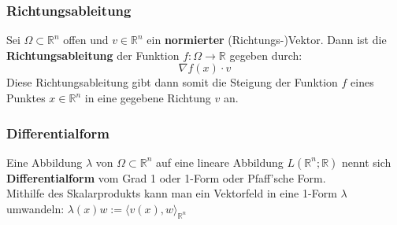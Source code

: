 \documentclass[a4paper,10pt]{scrartcl}
\begin{document}
\subsubsection{Richtungsableitung}
Sei $\Omega\subset \mathbb{R}^n$ offen und $v\in\mathbb{R}^n$ ein \textbf{normierter} (Richtungs-)Vektor. Dann ist die \textbf{Richtungsableitung} der Funktion $f:\Omega \to \mathbb{R}$ gegeben durch: 
\begin{equation}
	\nabla f(x)\cdot v
\end{equation}
Diese Richtungsableitung gibt dann somit die Steigung der Funktion $f$ eines Punktes $x\in\mathbb{R}^n$ in eine gegebene Richtung $v$ an. 
\subsubsection{Differentialform}
Eine Abbildung $\lambda$ von $\Omega\subset\mathbb{R}^n$ auf eine lineare Abbildung $L(\mathbb{R}^n;\mathbb{R})$ nennt sich \textbf{Differentialform} vom Grad 1 oder 1-Form oder Pfaff'sche Form. \\
Mithilfe des Skalarprodukts kann man ein Vektorfeld in eine 1-Form $\lambda$ umwandeln: $\lambda(x) w:= \langle v(x),w \rangle_{\mathbb{R}^n}$
\end{document}
